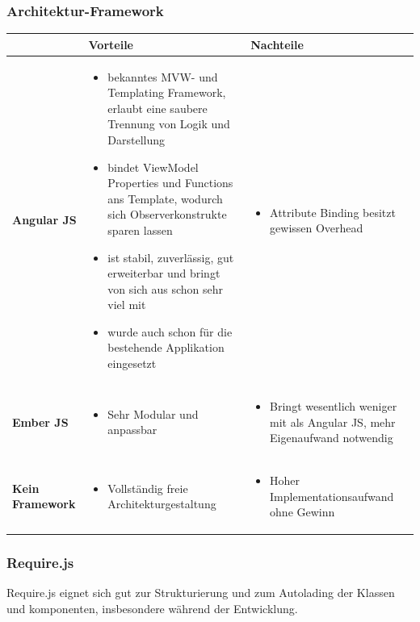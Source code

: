 		\subsubsection{Architektur-Framework}
			\begin{tabularx}{\textwidth}{|lXX|}
				\hline
					\textbf{} & \textbf{Vorteile} & \textbf{Nachteile}\\
				\hline
					\textbf{Angular JS} &
					\begin{itemize}
						\item bekanntes MVW- und Templating Framework, erlaubt eine saubere Trennung von Logik und Darstellung
						\item bindet ViewModel Properties und Functions ans Template, wodurch sich Observerkonstrukte sparen lassen
						\item ist stabil, zuverlässig, gut erweiterbar und bringt von sich aus schon sehr viel mit
						\item wurde auch schon für die bestehende Applikation eingesetzt
					\end{itemize} &
					\begin{itemize}
						\item Attribute Binding besitzt gewissen Overhead
					\end{itemize} \\
				\hline
					\textbf{Ember JS} &				
					\begin{itemize}
						\item Sehr Modular und anpassbar
					\end{itemize} &
					\begin{itemize}
						\item Bringt wesentlich weniger mit als Angular JS, mehr Eigenaufwand notwendig
					\end{itemize} \\
				\hline
					\textbf{Kein Framework} &
					\begin{itemize}
						\item Vollständig freie Architekturgestaltung
					\end{itemize} &
					\begin{itemize}
						\item Hoher Implementationsaufwand ohne Gewinn
					\end{itemize} \\
				\hline
			\end{tabularx}
			
			\subsubsection{Require.js}
				Require.js eignet sich gut zur Strukturierung und zum Autolading der Klassen und komponenten, 
				insbesondere während der Entwicklung.

